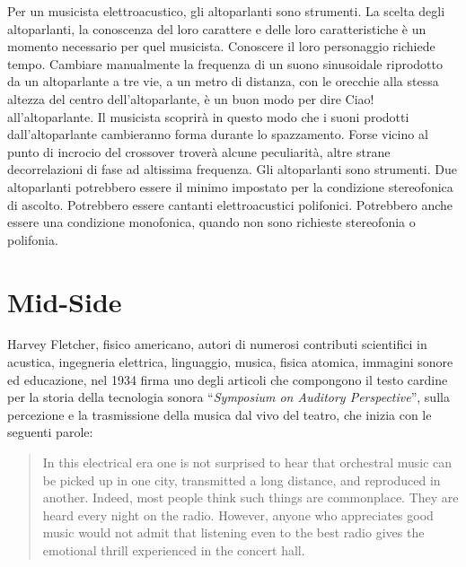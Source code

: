 Per un musicista elettroacustico, gli altoparlanti sono strumenti. La scelta
degli altoparlanti, la conoscenza del loro carattere e delle loro
caratteristiche è un momento necessario per quel musicista. Conoscere il loro
personaggio richiede tempo. Cambiare manualmente la frequenza di un suono
sinusoidale riprodotto da un altoparlante a tre vie, a un metro di distanza,
con le orecchie alla stessa altezza del centro dell'altoparlante, è un buon modo
per dire Ciao! all'altoparlante. Il musicista scoprirà in questo modo che i
suoni prodotti dall'altoparlante cambieranno forma durante lo spazzamento. Forse
vicino al punto di incrocio del crossover troverà alcune peculiarità, altre
strane decorrelazioni di fase ad altissima frequenza. Gli altoparlanti sono
strumenti. Due altoparlanti potrebbero essere il minimo impostato per la
condizione stereofonica di ascolto. Potrebbero essere cantanti elettroacustici
polifonici. Potrebbero anche essere una condizione monofonica, quando non sono
richieste stereofonia o polifonia.%

\section{Mid-Side}
Harvey Fletcher, fisico americano, autori di numerosi contributi scientifici in
acustica, ingegneria elettrica, linguaggio, musica, fisica atomica, immagini
sonore ed educazione, nel 1934 firma uno degli articoli che compongono il testo
cardine per la storia della tecnologia sonora “\emph{Symposium on Auditory
Perspective}”, sulla percezione e la trasmissione della musica dal vivo del
teatro, che inizia con le seguenti parole:

\begin{quotation}
In this electrical era one is not surprised to hear that orchestral music can be
picked up in one city, transmitted a long distance, and reproduced in another.
Indeed, most people think such things are commonplace. They are heard every
night on the radio. However, anyone who appreciates good music would not admit
that listening even to the best radio gives the emotional thrill experienced in
the concert hall. \cite{hf34}
\end{quotation}


